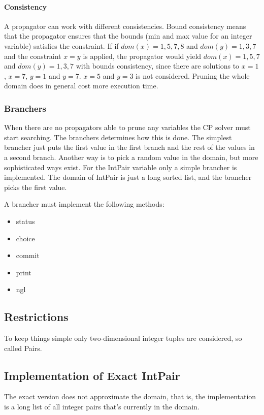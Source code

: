 \documentclass[a4paper,11pt]{article}
\begin{document}
\paragraph{Consistency}
A propagator can work with different consistencies. Bound consistency means that the propagator ensures that the bounds (min and max value for an integer variable) satisfies the constraint. If if $dom(x)={1,5,7,8}$ and $dom(y)={1,3,7}$ and the constraint $x=y$ is applied, the propagator would yield $dom(x)={1,5,7}$ and $dom(y)={1,3,7}$ with bounds consistency, since there are solutions to $x=1$, $x=7$, $y=1$ and $y=7$. $x=5$ and $y=3$ is not considered. Pruning the whole domain does in general cost more execution time.

\subsubsection{Branchers}
When there are no propagators able to prune any variables the CP solver must start searching. The branchers determines how this is done. The simplest brancher just puts the first value in the first branch and the rest of the values in a second branch. Another way is to pick a random value in the domain, but more sophisticated ways exist. For the IntPair variable only a simple brancher is implemented. The domain of IntPair is just a long sorted list, and the brancher picks the first value.

A brancher must implement the following methods:
\begin{itemize}
\item{status}
\item{choice}
\item{commit}
\item{print}
\item{ngl}
\end{itemize}

\subsection{Restrictions}
To keep things simple only two-dimensional integer tuples are considered, so called Pairs.

\subsection{Implementation of Exact IntPair}
The exact version does not approximate the domain, that is, the implementation is a long list of all integer pairs that's currently in the domain.
\end{document}
